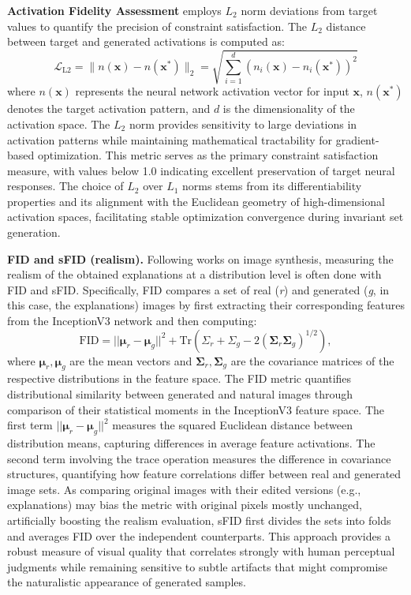 \textbf{Activation Fidelity Assessment} employs $L_2$ norm deviations from target values to quantify the precision of constraint satisfaction. The $L_2$ distance between target and generated activations is computed as:
\begin{equation}
\mathcal{L}_{\text{L2}} = \|n(\mathbf{x}) - n(\mathbf{x^*})\|_2 = \sqrt{\sum_{i=1}^{d}(n_i(\mathbf{x}) - n_i(\mathbf{x^*}))^2}
\end{equation}
where $n(\mathbf{x})$ represents the neural network activation vector for input $\mathbf{x}$, $n(\mathbf{x^*})$ denotes the target activation pattern, and $d$ is the dimensionality of the activation space. The $L_2$ norm provides sensitivity to large deviations in activation patterns while maintaining mathematical tractability for gradient-based optimization. This metric serves as the primary constraint satisfaction measure, with values below 1.0 indicating excellent preservation of target neural responses. The choice of $L_2$ over $L_1$ norms stems from its differentiability properties and its alignment with the Euclidean geometry of high-dimensional activation spaces, facilitating stable optimization convergence during invariant set generation.

\textbf{FID and sFID (realism).} Following works on image synthesis, measuring the realism of the obtained explanations at a distribution level is often done with FID and sFID. Specifically, FID compares a set of real (\emph{r}) and generated (\emph{g}, in this case, the explanations) images by first extracting their corresponding features from the InceptionV3 network and then computing:
\begin{equation}
\text{FID} = ||\boldsymbol{\mu}_r - \boldsymbol{\mu}_g||^2 + \text{Tr}\left( \Sigma_r + \Sigma_g - 2\left(\boldsymbol{\Sigma}_r \boldsymbol{\Sigma}_g \right)^{1/2} \right),
\end{equation}
where $\boldsymbol{\mu}_r, \boldsymbol{\mu}_g$ are the mean vectors and $\boldsymbol{\Sigma}_r, \boldsymbol{\Sigma}_g$ are the covariance matrices of the respective distributions in the feature space. The FID metric quantifies distributional similarity between generated and natural images through comparison of their statistical moments in the InceptionV3 feature space. The first term $||\boldsymbol{\mu}_r - \boldsymbol{\mu}_g||^2$ measures the squared Euclidean distance between distribution means, capturing differences in average feature activations. The second term involving the trace operation measures the difference in covariance structures, quantifying how feature correlations differ between real and generated image sets. As comparing original images with their edited versions (e.g., explanations) may bias the metric with original pixels mostly unchanged, artificially boosting the realism evaluation, sFID first divides the sets into folds and averages FID over the independent counterparts. This approach provides a robust measure of visual quality that correlates strongly with human perceptual judgments while remaining sensitive to subtle artifacts that might compromise the naturalistic appearance of generated samples.

